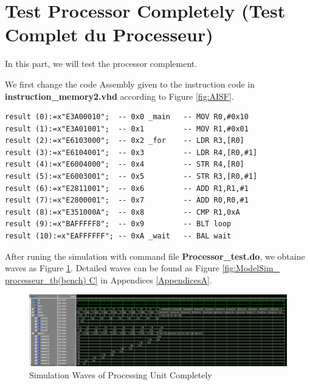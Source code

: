 \section{Test Processor Completely (Test Complet du Processeur)}
\label{sec:Test Processor Completely (Test Complet du Processeur)}
In this part, we will test the processor complement.

We first change the code Assembly given to the instruction code in \textbf{instruction\_memory2.vhd} according to Figure \ref{fig:AISF}.
\begin{lstlisting}[style = vhdl,columns=fixed]
result (0):=x"E3A00010";  -- 0x0 _main   -- MOV R0,#0x10
result (1):=x"E3A01001";  -- 0x1		 -- MOV R1,#0x01
result (2):=x"E6103000";  -- 0x2 _for    -- LDR R3,[R0]
result (3):=x"E6104001";  -- 0x3		 -- LDR R4,[R0,#1]
result (4):=x"E6004000";  -- 0x4		 -- STR R4,[R0]
result (5):=x"E6003001";  -- 0x5		 -- STR R3,[R0,#1]
result (6):=x"E2811001";  -- 0x6		 -- ADD R1,R1,#1
result (7):=x"E2800001";  -- 0x7		 -- ADD R0,R0,#1
result (8):=x"E351000A";  -- 0x8		 -- CMP R1,0xA
result (9):=x"BAFFFFF8";  -- 0x9		 -- BLT loop
result (10):=x"EAFFFFFF"; -- 0xA _wait	 -- BAL wait
\end{lstlisting}

After runing the simulation with command file \textbf{Processor\_test.do}, we obtaine waves as Figure \ref{fig:PUCres}.
Detailed waves can be found as Figure \ref{fig:ModelSim_ processeur_tb(bench) C} in Appendices \ref{AppendicesA}.

\begin{figure}[htp]
    \centering
    \includegraphics[width=1\textwidth]{picture/PUCres.jpg}
    \caption{Simulation Waves of Processing Unit Completely}     
    \label{fig:PUCres}
\end{figure}